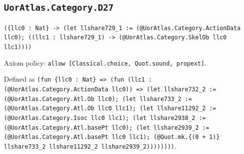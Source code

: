 \documentclass[11pt]{article}
\begin{document}
\subsection*{\texttt{UorAtlas.Category.D27}}
\noindent\texttt{(\{llc0 : Nat\} -> (let llshare729\_1 := (@UorAtlas.Category.ActionData llc0); ((llc1 : llshare729\_1) -> (@UorAtlas.Category.SkelOb llc0 llc1))))}\par
\noindent Axiom policy: \texttt{allow [Classical.choice, Quot.sound, propext]}.\par
\noindent Defined as \texttt{(fun \{llc0 : Nat\} => (fun (llc1 : (@UorAtlas.Category.ActionData llc0)) => (let llshare732\_2 := (@UorAtlas.Category.Atl.Ob llc0); (let llshare733\_2 := (@UorAtlas.Category.Atl.Ob llc0 llc1); (let llshare11292\_2 := (@UorAtlas.Category.Isoc llc0 llc1); (let llshare2938\_2 := (@UorAtlas.Category.Atl.basePt llc0); (let llshare2939\_2 := (@UorAtlas.Category.Atl.basePt llc0 llc1); (@Quot.mk.\{(0 + 1)\} llshare733\_2 llshare11292\_2 llshare2939\_2))))))))}.\par
\end{document}
